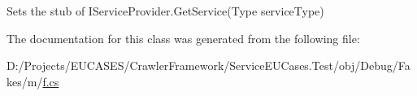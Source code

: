 Sets the stub of I\-Service\-Provider.\-Get\-Service(\-Type service\-Type)



The documentation for this class was generated from the following file\-:\begin{DoxyCompactItemize}
\item 
D\-:/\-Projects/\-E\-U\-C\-A\-S\-E\-S/\-Crawler\-Framework/\-Service\-E\-U\-Cases.\-Test/obj/\-Debug/\-Fakes/m/\hyperlink{m_2f_8cs}{f.\-cs}\end{DoxyCompactItemize}
